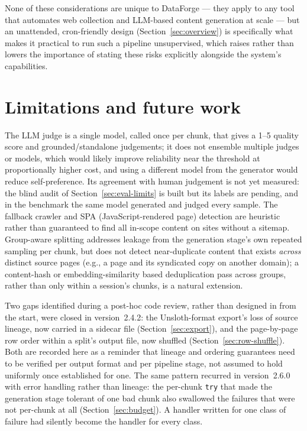 \documentclass[11pt]{article}
\begin{document}
None of these considerations are unique to DataForge --- they apply to
any tool that automates web collection and LLM-based content generation
at scale --- but an unattended, cron-friendly design (Section~\ref{sec:overview}) is
specifically what makes it practical to run such a pipeline
unsupervised, which raises rather than lowers the importance of stating
these risks explicitly alongside the system's capabilities.

\section{Limitations and future work}
\label{sec:limitations}

The LLM judge is a single model, called once per chunk, that gives a 1--5
quality score and grounded/standalone judgements; it does not ensemble
multiple judges or models, which would likely improve reliability near
the threshold at proportionally higher cost, and using a different model
from the generator would reduce self-preference. Its agreement with human judgement is not yet measured: the
blind audit of Section~\ref{sec:eval-limits} is built but its labels are
pending, and in the benchmark the same model generated and judged every
sample. The fallback crawler and SPA (JavaScript-rendered page)
detection are heuristic rather than guaranteed to find all in-scope
content on sites without a sitemap. Group-aware splitting addresses
leakage from the generation stage's own repeated sampling per chunk, but
does not detect near-duplicate content that exists \emph{across} distinct
source pages (e.g., a page and its syndicated copy on another domain);
a content-hash or embedding-similarity based deduplication pass across
groups, rather than only within a session's chunks, is a natural
extension.

Two gaps identified during a post-hoc code review, rather than designed
in from the start, were closed in version~2.4.2: the Unsloth-format
export's loss of source lineage, now carried in a sidecar file
(Section~\ref{sec:export}), and the page-by-page row order within a
split's output file, now shuffled (Section~\ref{sec:row-shuffle}). Both
are recorded here as a reminder that lineage and ordering guarantees
need to be verified per output format and per pipeline stage, not
assumed to hold uniformly once established for one. The same pattern
recurred in version~2.6.0 with error handling rather than lineage: the
per-chunk \texttt{try} that made the generation stage tolerant of one bad
chunk also swallowed the failures that were not per-chunk at all
(Section~\ref{sec:budget}). A handler written for one class of failure
had silently become the handler for every class.
\end{document}
